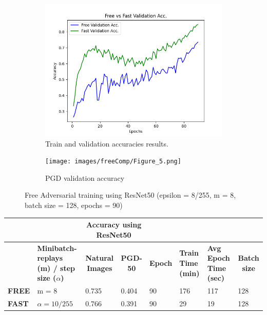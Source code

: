 \documentclass{article}
\begin{document}
\begin{figure}[hbt!]
  \centering
  \begin{subfigure}[b]{0.4\linewidth}
    \includegraphics[width=\linewidth]{images/freeComp/Figure_1.png}
    \caption{ Train and validation accuracies results.}
  \end{subfigure}
  \begin{subfigure}[b]{0.4\linewidth}
    \texttt{[image: images/freeComp/Figure\_5.png]}
    \caption{PGD validation accuracy}
  \end{subfigure}
  \caption{Free Adversarial training using ResNet50 (epsilon = 8/255, m = 8, batch size = 128,  epochs = 90)}
  \label{fig:coffee}
\end{figure}

\begin{table}[hbt!]
\begin{tabular}{|l|p{2.1cm}|c|l|l|l|l|l|}
\hline
              & \multicolumn{1}{l|}{}         & \multicolumn{2}{c|}{\textbf{Accuracy using ResNet50}}                         & \multicolumn{3}{l|}{\textbf{}}                                                                                                            & \textbf{}                                \\ \hline
 & \textbf{Minibatch-replays (m) / step size ($\alpha$)} & \textbf{Natural Images}                      & \multicolumn{1}{c|}{\textbf{PGD-50}} & \multicolumn{1}{c|}{\textbf{Epoch}} & \multicolumn{1}{p{1cm}|}{\textbf{Train Time (min)}} & \multicolumn{1}{p{1cm}|}{\textbf{Avg Epoch Time (sec)}} & \multicolumn{1}{c|}{\textbf{Batch size}} \\ \hline
\textbf{FREE} & m = 8 & \multicolumn{1}{l|}{0.735} & { 0.404}         & { 90}           & { 176}                     & { 117}                         & { 128}               \\ \hline
\textbf{FAST} & $\alpha = 10/255$       & \multicolumn{1}{l|}{0.766} & { 0.391}         & { 90}           & { 29}                     & { 19}                         & { 128}               \\ \hline
\end{tabular}
\end{table}
\end{document}
